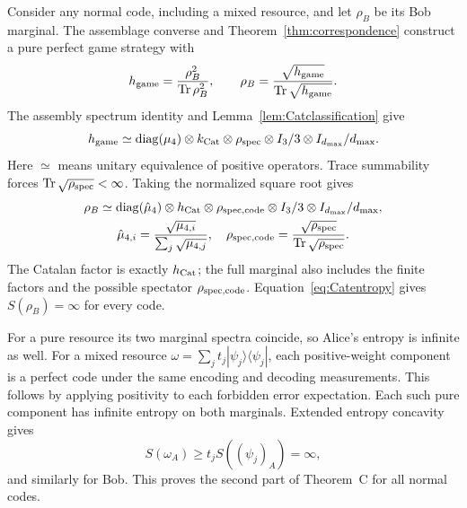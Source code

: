 Consider any normal code, including a mixed resource, and let $\rho_B$ be its Bob marginal. The assemblage converse and Theorem~\ref{thm:correspondence} construct a pure perfect game strategy with
\[
 h_{\rm game}=\frac{\rho_B^2}{\operatorname{Tr}\rho_B^2},\qquad
 \rho_B=\frac{\sqrt{h_{\rm game}}}{\operatorname{Tr}\sqrt{h_{\rm game}}}.
\]
The assembly spectrum identity and Lemma~\ref{lem:Catclassification} give
\[
 h_{\rm game}\simeq
 \operatorname{diag}(\mu_4)\otimes k_{\mathrm{Cat}}\otimes\rho_{\rm spec}
 \otimes I_3/3\otimes I_{d_{\max}}/d_{\max}.
\]
Here $\simeq$ means unitary equivalence of positive operators. Trace summability forces $\operatorname{Tr}\sqrt{\rho_{\rm spec}}<\infty$. Taking the normalized square root gives
\begin{equation}\label{eq:codemarginal}
\begin{gathered}
 \rho_B\simeq\operatorname{diag}(\hat\mu_4)\otimes h_{\mathrm{Cat}}\otimes\rho_{\rm spec,code}
                 \otimes I_3/3\otimes I_{d_{\max}}/d_{\max},\\
 \hat\mu_{4,i}=\frac{\sqrt{\mu_{4,i}}}{\sum_j\sqrt{\mu_{4,j}}},\quad
 \rho_{\rm spec,code}=\frac{\sqrt{\rho_{\rm spec}}}{\operatorname{Tr}\sqrt{\rho_{\rm spec}}}.
\end{gathered}
\end{equation}
The Catalan factor is exactly $h_{\mathrm{Cat}}$; the full marginal also includes the finite factors and the possible spectator $\rho_{\rm spec,code}$. Equation~\eqref{eq:Catentropy} gives $S(\rho_B)=\infty$ for every code.

For a pure resource its two marginal spectra coincide, so Alice's entropy is infinite as well. For a mixed resource $\omega=\sum_jt_j|\psi_j\rangle\langle\psi_j|$, each positive-weight component is a perfect code under the same encoding and decoding measurements. This follows by applying positivity to each forbidden error expectation. Each such pure component has infinite entropy on both marginals. Extended entropy concavity gives
\[
 S(\omega_A)\geq t_j S((\psi_j)_A)=\infty,
\]
and similarly for Bob. This proves the second part of Theorem~C for all normal codes.
